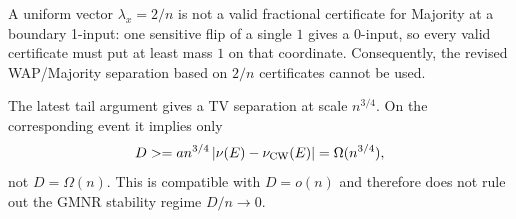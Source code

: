 A uniform vector \(\lambda_x=2/n\) is not a valid fractional certificate for Majority at a boundary 1-input: one sensitive flip of a single \(1\) gives a 0-input, so every valid certificate must put at least mass \(1\) on that coordinate. Consequently, the revised WAP/Majority separation based on \(2/n\) certificates cannot be used.

The latest tail argument gives a TV separation at scale \(n^{3/4}\). On the corresponding event it implies only
\[D\ge a n^{3/4}\,|\nu(E)-\nu_{\rm CW}(E)|=\Omega(n^{3/4}),\]
not \(D=\Omega(n)\). This is compatible with \(D=o(n)\) and therefore does not rule out the GMNR stability regime \(D/n\to0\).
